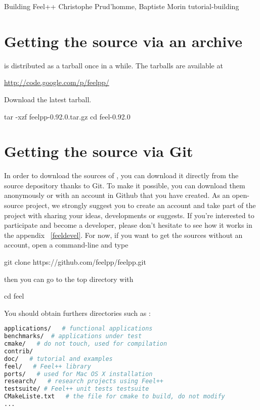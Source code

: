             {Building Feel++}
            {Christophe Prud'homme, Baptiste Morin}
            {tutorial-building}

\section{Getting the source via an archive}
\label{sec:getting-source-via-1}

\feel is distributed as a tarball once in a while. The tarballs are available
at
\begin{center}
  \href{http://code.google.com/p/feelpp/}{http://code.google.com/p/feelpp/}
\end{center}
Download the latest tarball.

\begin{unixcom}
  tar -xzf feelpp-0.92.0.tar.gz
  cd feel-0.92.0
\end{unixcom}


\section{Getting the source via Git}
\label{sec:getting-source-via}
In order to download the sources of \feel, you can download it directly from the source depository
thanks to Git. To make it possible, you can download them anonymously or with an account in Github that you have created. As an open-source project, we strongly suggest you to create an account and take part of the project with sharing your ideas, developments or suggests. If you're interested to participate and become a \feel developer, please don't hesitate to see how it works in the appendix ~\ref{feeldevel}. For now, if you want to get the sources without an account, open a command-line and type
\begin{unixcom}
    git clone https://github.com/feelpp/feelpp.git
\end{unixcom}
then you can go to the \feel top directory with
\begin{unixcom}
		cd feel
\end{unixcom}
You should obtain furthers directories such as :
\begin{lstlisting}[language=sh]
applications/   # functional applications
benchmarks/  # applications under test
cmake/   # do not touch, used for compilation
contrib/
doc/   # tutorial and examples
feel/   # Feel++ library
ports/   # used for Mac OS X installation
research/   # research projects using Feel++
testsuite/ # Feel++ unit tests testsuite
CMakeListe.txt   # the file for cmake to build, do not modify
...
\end{lstlisting}


